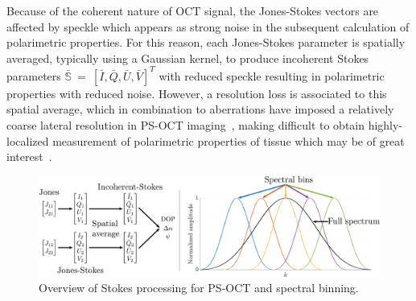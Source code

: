 
Because of the coherent nature of OCT signal, the Jones-Stokes vectors are affected by speckle which appears as strong noise in the subsequent calculation of polarimetric properties. For this reason, each Jones-Stokes parameter is spatially averaged, typically using a Gaussian kernel, to produce incoherent Stokes parameters $\mathbf{\bar{\mathbb{S}}}~=~[\bar{I}, \bar{Q}, \bar{U}, \bar{V}]^T$ with reduced speckle resulting in polarimetric properties with reduced noise. However, a resolution loss is associated to this spatial average, which in combination to aberrations have imposed a relatively coarse lateral resolution in PS-OCT imaging~\cite{Cense2009_Retinal}, making difficult to obtain highly-localized measurement of polarimetric properties of tissue which may be of great interest~\cite{Cense2009_Retinal, Li2020_Vectorial}.

\begin{figure}[htb!]
	\centering
	\includegraphics[width=\textwidth]{Figures/SHARP/PSOCT-Processing.pdf}
	\caption[Overview of Stokes processing for PS-OCT and spectral binning.]{Overview of Stokes processing for PS-OCT and spectral binning.}
	\label{fig:PSOCTProc}
\end{figure}

